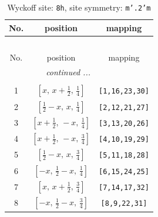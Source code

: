 \documentclass[fleqn,8pt]{jsarticle}
\begin{document}
\begin{longtable}{ccc}
\caption{Wyckoff site: {\tt 8h}, site symmetry: {\tt m'.2'm}}
 \\
 \hline \hline
No. & position & mapping \\ \hline \endfirsthead

\multicolumn{2}{l}{\tablename\ \thetable{}} \\
 \hline \hline
No. & position & mapping \\ \hline \endhead

 \hline \hline
\multicolumn{2}{r}{\footnotesize\it continued ...} \\ \endfoot

 \hline \hline
\multicolumn{2}{r}{} \\ \endlastfoot

1 & $\left[ x,\, x + \frac{1}{2},\, \frac{1}{4} \right]$ & {\tt [1,16,23,30]} \\ \hline
2 & $\left[ \frac{1}{2} - x,\, x,\, \frac{1}{4} \right]$ & {\tt [2,12,21,27]} \\ \hline
3 & $\left[ x + \frac{1}{2},\, - x,\, \frac{1}{4} \right]$ & {\tt [3,13,20,26]} \\ \hline
4 & $\left[ x + \frac{1}{2},\, - x,\, \frac{3}{4} \right]$ & {\tt [4,10,19,29]} \\ \hline
5 & $\left[ \frac{1}{2} - x,\, x,\, \frac{3}{4} \right]$ & {\tt [5,11,18,28]} \\ \hline
6 & $\left[ - x,\, \frac{1}{2} - x,\, \frac{1}{4} \right]$ & {\tt [6,15,24,25]} \\ \hline
7 & $\left[ x,\, x + \frac{1}{2},\, \frac{3}{4} \right]$ & {\tt [7,14,17,32]} \\ \hline
8 & $\left[ - x,\, \frac{1}{2} - x,\, \frac{3}{4} \right]$ & {\tt [8,9,22,31]} \\
\end{longtable}
\renewcommand{\arraystretch}{1.2}
\end{document}
